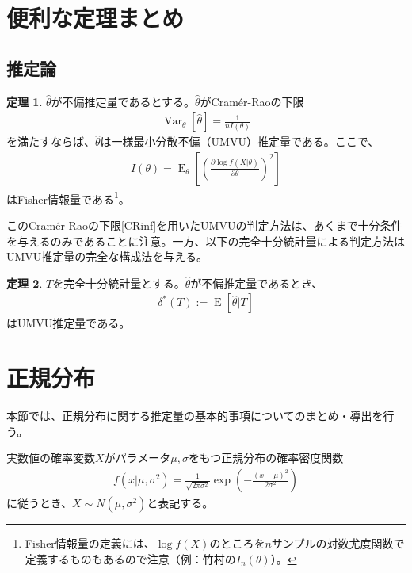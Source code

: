 \documentclass[11pt]{ltjsarticle}
\theoremstyle{definition}
\newtheorem{theorem}{定理}[section]
\DeclareMathOperator{\E}{E}
\DeclareMathOperator{\Var}{Var}
\begin{document}
\tableofcontents

\section{便利な定理まとめ}
\subsection{推定論}
\begin{theorem}\label{th:UMVU1}
    $\hat{\theta}$が不偏推定量であるとする。$\hat{\theta}$がCram\'{e}r-Raoの下限
    \begin{align}\label{CRinf}
        \Var_\theta[\hat{\theta}] = \frac{1}{nI(\theta)}
    \end{align}
    を満たすならば、$\hat{\theta}$は一様最小分散不偏（UMVU）推定量である。ここで、
    \begin{align}
        I(\theta) = \E_\theta\left[\left(\frac{\partial \log f(X|\theta)}{\partial \theta}\right)^2\right]
    \end{align}
    はFisher情報量である\footnote{Fisher情報量の定義には、$\log f(X)$のところを$n$サンプルの対数尤度関数で定義するものもあるので注意（例：竹村の$I_n(\theta)$）。}。
\end{theorem}

このCram\'{e}r-Raoの下限\eqref{CRinf}を用いたUMVUの判定方法は、あくまで十分条件を与えるのみであることに注意。一方、以下の完全十分統計量による判定方法はUMVU推定量の完全な構成法を与える。

\begin{theorem}
    $T$を完全十分統計量とする。$\hat{\theta}$が不偏推定量であるとき、
    \begin{align}
        \delta^*(T) :=\E[\hat{\theta}|T]
    \end{align}
    はUMVU推定量である。
\end{theorem}
\section{正規分布}
本節では、正規分布に関する推定量の基本的事項についてのまとめ・導出を行う。

実数値の確率変数$X$がパラメータ$\mu, \sigma$をもつ正規分布の確率密度関数
\begin{align}
    f(x|\mu, \sigma^2) = \frac{1}{\sqrt{2\pi \sigma^2}}\exp\left(-\frac{(x - \mu)^2}{2\sigma^2}\right)
\end{align}
に従うとき、$X\sim N(\mu, \sigma^2)$と表記する。
\end{document}
